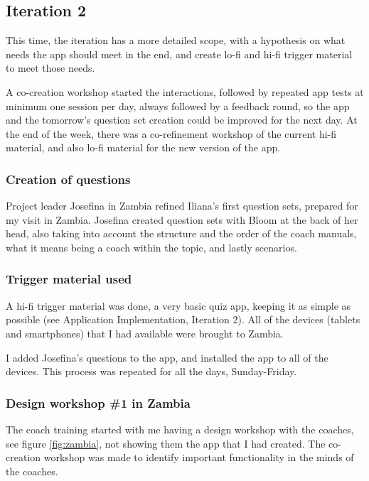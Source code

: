 \subsection{Iteration 2}

This time, the iteration has a more detailed scope, with a hypothesis on what needs the app should meet in the end, and create lo-fi and hi-fi trigger material to meet those needs.

A co-creation workshop started the interactions, followed by repeated app tests at minimum one session per day, always followed by a feedback round, so the app and the tomorrow's question set creation could be improved for the next day. At the end of the week, there was a co-refinement workshop of the current hi-fi material, and also lo-fi material for the new version of the app.

\subsubsection*{Creation of questions}
Project leader Josefina in Zambia refined Iliana's first question sets, prepared for my visit in Zambia. Josefina created question sets with Bloom at the back of her head, also taking into account the structure and the order of the coach manuals, what it means being a coach within the topic, and lastly scenarios.

\subsubsection{Trigger material used}
A hi-fi trigger material was done, a very basic quiz app, keeping it as simple as possible (see Application Implementation, Iteration 2). All of the devices (tablets and smartphones) that I had available were brought to Zambia.

I added Josefina's questions to the app, and installed the app to all of the devices. This process was repeated for all the days, Sunday-Friday.

\subsubsection{Design workshop \#1 in Zambia}
The coach training started with me having a design workshop with the coaches, see figure \ref{fig:zambia}, not showing them the app that I had created. The co-creation workshop was made to identify important functionality in the minds of the coaches.

